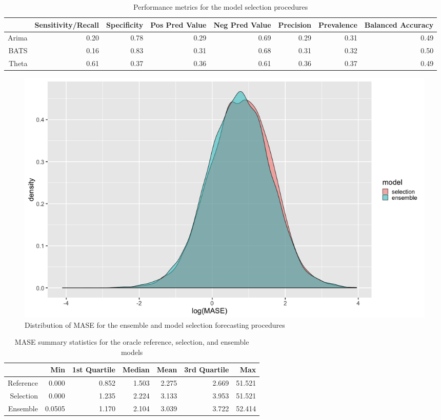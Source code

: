 \documentclass[11pt,3p,review,authoryear]{elsarticle}
\begin{document}
\begin{table}[ht]
\centering
\begin{adjustbox}{width=1\textwidth}
\begin{tabular}{rrrrrrrr}
  \hline
 & Sensitivity/Recall & Specificity & Pos Pred Value & Neg Pred Value & Precision & Prevalence & Balanced Accuracy \\ 
  \hline
Arima & 0.20 & 0.78 & 0.29 & 0.69 & 0.29 & 0.31 & 0.49 \\ 
  BATS & 0.16 & 0.83 & 0.31 & 0.68 & 0.31 & 0.32 & 0.50 \\ 
  Theta & 0.61 & 0.37 & 0.36 & 0.61 & 0.36 & 0.37 & 0.49 \\ 
   \hline
\end{tabular}
\end{adjustbox}
\caption{Performance metrics for the model selection procedures}\label{tab:a}
\end{table}


\begin{figure}[h]
\centering
\includegraphics[width=\textwidth]{distribution}
\caption{Distribution of MASE for the ensemble and model selection forecasting procedures}\label{fig:a}
\end{figure}

\begin{table}[ht]
\centering
{}
\begin{tabular}{rrrrrrr}
\hline
& Min & 1st Quartile & Median & Mean & 3rd Quartile & Max\\
\hline
Reference \vline & 0.000 & 0.852 & 1.503 & 2.275 & 2.669 & 51.521\\
Selection \vline & 0.000 & 1.235 & 2.224 & 3.133 & 3.953 & 51.521 \\
Ensemble \vline & 0.0505 & 1.170 & 2.104 & 3.039 & 3.722 & 52.414\\
\hline
\end{tabular}
\caption{MASE summary statistics for the oracle reference, selection, and ensemble models}\label{tab:c}
\end{table}
\end{document}
